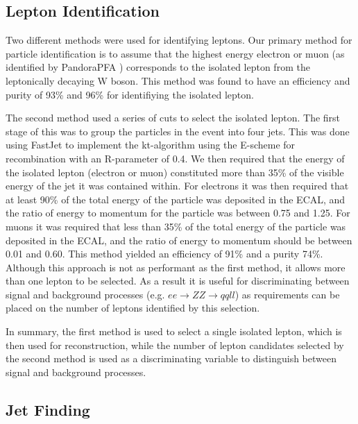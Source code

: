 \subsection{Lepton Identification}
Two different methods were used for identifying leptons. Our primary method for particle identification is to assume that the highest energy electron or muon (as identified by PandoraPFA \cite{Thomson200925}) corresponds to the isolated lepton from the leptonically decaying W boson. This method was found to have an efficiency and purity of 93\% and 96\% for identifiying the isolated lepton. 

The second method used a series of cuts to select the isolated lepton. The first stage of this was to group the particles in the event into four jets. This was done using FastJet \cite{Cacciari:2011ma} to implement the kt-algorithm using the E-scheme for recombination with an R-parameter of 0.4. We then required that the energy of the isolated lepton (electron or muon) constituted more than 35\% of the visible energy of the jet it was contained within. For electrons it was then required that at least 90\% of the total energy of the particle was deposited in the ECAL, and the ratio of energy to momentum for the particle was between 0.75 and 1.25. For muons it was required that less than 35\% of the total energy of the particle was deposited in the ECAL, and the ratio of energy to momentum should be between 0.01 and 0.60. This method yielded an efficiency of 91\% and a purity 74\%. Although this approach is not as performant as the first method, it allows more than one lepton to be selected. As a result it is useful for discriminating between signal and background processes (e.g. $ee\rightarrow ZZ\rightarrow qqll$) as requirements can be placed on the number of leptons identified by this selection.

In summary, the first method is used to select a single isolated lepton, which is then used for reconstruction, while the number of lepton candidates selected by the second method is used as a discriminating variable to distinguish between signal and background processes. 

\subsection{Jet Finding}

